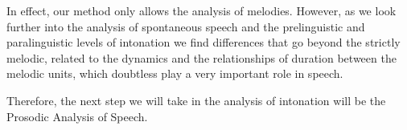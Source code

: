 \documentclass[output=paper]{langscibook}
\begin{document}
In effect, our method only allows the analysis of melodies. However, as we look further into the analysis of spontaneous speech and the prelinguistic and paralinguistic levels of intonation we find differences that go beyond the strictly melodic, related to the dynamics and the relationships of duration between the melodic units, which doubtless play a very important role in speech. 

Therefore, the next step we will take in the analysis of intonation will be the Prosodic Analysis of Speech.


{\sloppy
\printbibliography[heading=subbibliography,notkeyword=this]
}
\end{document}
